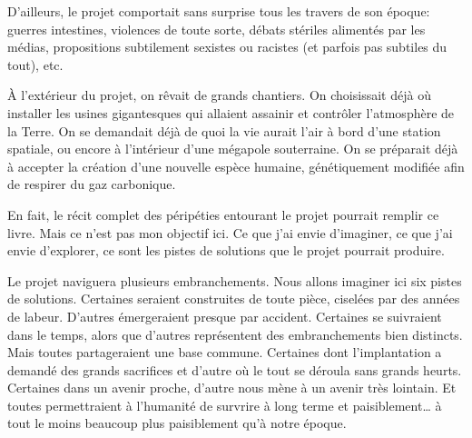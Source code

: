 D'ailleurs, le projet \nomProjet{} comportait sans surprise tous les
travers de son époque: guerres intestines, violences de toute sorte, débats
stériles alimentés par les médias, propositions
subti\-le\-ment sexistes ou racistes (et parfois pas subtiles du tout), etc.

À l'extérieur du projet, on rêvait de grands chantiers.  On choisissait
déjà où installer les usines gigantesques qui allaient assainir et
contrô\-ler l'at\-mosphère de la Terre. On se demandait déjà de quoi la vie
aurait l'air à bord d'une station spatiale, ou encore à l'intérieur d'une
mégapole souterraine. On se préparait déjà à accepter la création d'une
nouvelle espèce humaine, génétiquement modifiée afin de respirer du gaz
carbo\-nique.

En fait, le récit complet des péripéties entourant le projet \nomProjet{} pourrait
remplir ce livre. Mais ce n'est pas mon objectif ici. 
Ce que j'ai envie d'imaginer, ce que j'ai envie d'explorer, ce sont les pistes de solutions
que le projet pourrait produire.

Le projet \nomProjet{} naviguera plusieurs embranchements.  Nous allons
imaginer ici six pistes de solutions.  Certaines seraient construites de toute
pièce, ciselées par des années de labeur.  D'autres émergeraient presque par
accident.  Certaines se suivraient dans le temps, alors que d'autres
représentent des embranchements bien distincts. Mais toutes partageraient une
base commune.  
Certaines dont l'implantation a demandé des grands sacrifices et d'autre où le tout se déroula
sans grands heurts. 
Certaines dans un avenir proche, d'autre nous mène à un avenir très lointain.
Et toutes permettraient à l'humanité de survrire à long terme et
paisiblement\ldots{} à tout le moins beaucoup plus paisiblement qu'à notre
époque.
